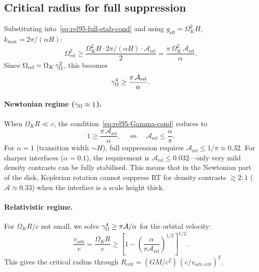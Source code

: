\subsection{Critical radius for full suppression}

Substituting into~\eqref{eq:rel95-full-stab-cond} and using
$g_{\mathrm{eff}} = \Omega_{K}^{2}H$, $k_{\max} = 2\pi/(\alpha H)$:
\begin{equation}
\Omega_{\mathrm{rel}}^{2}
  \geq \frac{\Omega_{K}^{2}H \cdot 2\pi/(\alpha H)
    \cdot \mathcal{A}_{\mathrm{rel}}}{2}
  = \frac{\pi\,\Omega_{K}^{2}\,\mathcal{A}_{\mathrm{rel}}}{\alpha}.
\label{eq:rel95-crit-cond}
\end{equation}
Since $\Omega_{\mathrm{rel}} = \Omega_{K}\,\gamma_{\Omega}^{2}$,
this becomes
\begin{equation}
\gamma_{\Omega}^{4}
  \geq \frac{\pi\,\mathcal{A}_{\mathrm{rel}}}{\alpha}.
\label{eq:rel95-Gamma-cond}
\end{equation}

\paragraph{Newtonian regime ($\gamma_{\Omega} \approx 1$).}
When $\Omega_{K}R \ll c$, the condition~\eqref{eq:rel95-Gamma-cond}
reduces to
\begin{equation}
1 \geq \frac{\pi\,\mathcal{A}_{\mathrm{rel}}}{\alpha},
\quad\Longleftrightarrow\quad
\mathcal{A}_{\mathrm{rel}}
  \leq \frac{\alpha}{\pi}.
\label{eq:rel95-Newton-cond}
\end{equation}
For $\alpha = 1$ (transition width $\sim H$), full suppression
requires $\mathcal{A}_{\mathrm{rel}} \leq 1/\pi \approx 0.32$.
For sharper interfaces ($\alpha = 0.1$), the requirement is
$\mathcal{A}_{\mathrm{rel}} \leq 0.032$---only very mild
density contrasts can be fully stabilised.  This means that in the
Newtonian part of the disk, Keplerian rotation cannot suppress RT
for density contrasts $\gtrsim 2:1$ ($\mathcal{A} \approx 0.33$)
when the interface is a scale height thick.

\paragraph{Relativistic regime.}
For $\Omega_{K}R/c$ not small, we solve
$\gamma_{\Omega}^{4} \geq \pi\mathcal{A}/\alpha$ for the
orbital velocity:
\begin{equation}
\frac{v_{\mathrm{orb}}}{c}
  = \frac{\Omega_{K}R}{c}
  \geq \left[1 - \left(\frac{\alpha}
    {\pi\mathcal{A}_{\mathrm{rel}}}\right)^{1/2}\right]^{1/2}.
\label{eq:rel95-vorb-crit}
\end{equation}
This gives the critical radius through
$R_{\mathrm{crit}} = (GM/c^{2})\,(c/v_{\mathrm{orb,crit}})^{2}$.

